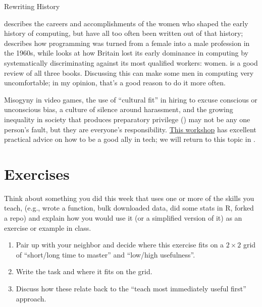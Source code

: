 \begin{callout}{Rewriting History}

  \cite{Abba2012} describes the careers and accomplishments of the
  women who shaped the early history of computing, but have all too
  often been written out of that history; \cite{Ensm2003,Ensm2012}
  describes how programming was turned from a female into a male
  profession in the 1960s, while \cite{Hick2018} looks at how Britain
  lost its early dominance in computing by systematically
  discriminating against its most qualified workers: women.
  \cite{Milt2018} is a good review of all three books.  Discussing
  this can make some men in computing very uncomfortable; in my
  opinion, that's a good reason to do it more often.

\end{callout}

Misogyny in video games, the use of ``cultural fit'' in hiring to
excuse conscious or unconscious bias, a culture of silence around
harassment, and the growing inequality in society that produces
preparatory privilege () may not be any one
person's fault, but they are everyone's responsibility.
\href{https://frameshiftconsulting.com/ally-skills-workshop/}{This
  workshop} has excellent practical advice on how to be a good ally in
tech; we will return to this topic in .

\section{Exercises}\label{s:motivation-exercises}


Think about something you did this week that uses one or more of the
skills you teach, (e.g., wrote a function, bulk downloaded data, did
some stats in R, forked a repo) and explain how you would use it (or a
simplified version of it) as an exercise or example in class.

\begin{enumerate}

\item
  Pair up with your neighbor and decide where this exercise fits on a
  $2{\times}2$ grid of ``short/long time to master'' and ``low/high
  usefulness''.

\item
  Write the task and where it fits on the grid.

\item
  Discuss how these relate back to the ``teach most immediately useful
  first'' approach.

\end{enumerate}


